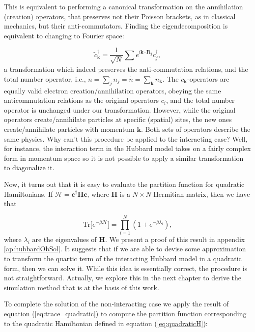 This is equivalent to performing a canonical transformation on the annihilation (creation) operators, that preserves not their Poisson brackets, as in classical mechanics, but their anti-commutators.
Finding the eigendecomposition is equivalent to changing to Fourier space:

\begin{equation}
\tilde{c}_{\bm k}^\dagger = \frac{1}{\sqrt{N}} \sum_{} e^{i \bm k \cdot \bm R_j} c_j^\dagger ,
\end{equation}
a transformation which indeed preserves the anti-commutation relations, and the total number operator, i.e., $n = \sum_j n_j = \tilde{n} = \sum_{\bm k} n_{\bm k}$.
The $\tilde{c}_{\bm k}$-operators are equally valid electron creation/annihilation operators, obeying the same anticommutation relations as the original operators $c_i$, and the total number operator is unchanged under our transformation.
However, while the original operators create/annihilate particles at specific (spatial) sites, the new ones create/annihilate particles with momentum ${\bm k}$.
Both sets of operators describe the same physics.
Why can't this procedure be applied to the interacting case?
Well, for instance, the interaction term in the Hubbard model takes on a fairly complex form in momentum space so it is not possible to apply a similar transformation to diagonalize it.

Now, it turns out that it is easy to evaluate the partition function for quadratic Hamiltonians. If $\mathcal{H} = \bm c^\dagger \bm H \bm c$, where $\bm H$ is a $N \times N$ Hermitian matrix, then we have that

\begin{equation}\label{eq:trace_quadratic}
\text{Tr} \big[ e^{-\beta \mathcal{H} } \big] = \prod_{i=1}^N ( 1 + e^{-\beta \lambda_i } ) ,
\end{equation}
where $\lambda_i$ are the eigenvalues of $\bm H$. We present a proof of this result in appendix \ref{ap:hubbardObSol}.
It suggests that if we are able to devise some approximation to transform the quartic term of the interacting Hubbard model in a quadratic form, then we can solve it.
While this idea is essentially correct, the procedure is not straightforward.
Actually, we explore this in the next chapter to derive the simulation method that is at the basis of this work.

To complete the solution of the non-interacting case we apply the result of equation (\ref{eq:trace_quadratic}) to compute the partition function corresponding to the quadratic Hamiltonian defined in equation (\ref{eq:quadraticH}):

